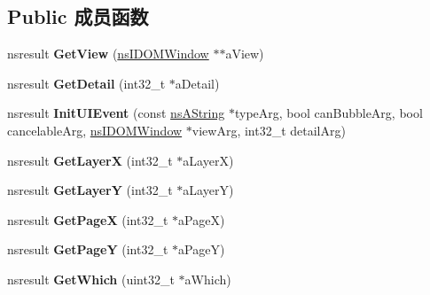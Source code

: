 \subsection*{Public 成员函数}
\begin{DoxyCompactItemize}
\item 
\mbox{\label{interfacens_i_d_o_m_u_i_event_a0cf4ab5a8ab56b5f8e08f48831ef4e7d}} 
nsresult {\bfseries Get\+View} (\hyperlink{interfacens_i_d_o_m_window}{ns\+I\+D\+O\+M\+Window} $\ast$$\ast$a\+View)
\item 
\mbox{\label{interfacens_i_d_o_m_u_i_event_ad0227746e026d51cd60985fc36b46f92}} 
nsresult {\bfseries Get\+Detail} (int32\+\_\+t $\ast$a\+Detail)
\item 
\mbox{\label{interfacens_i_d_o_m_u_i_event_ac4072bce3d33cdb7b36c7b4d20dc8b73}} 
nsresult {\bfseries Init\+U\+I\+Event} (const \hyperlink{structns_string_container}{ns\+A\+String} $\ast$type\+Arg, bool can\+Bubble\+Arg, bool cancelable\+Arg, \hyperlink{interfacens_i_d_o_m_window}{ns\+I\+D\+O\+M\+Window} $\ast$view\+Arg, int32\+\_\+t detail\+Arg)
\item 
\mbox{\label{interfacens_i_d_o_m_u_i_event_a8554fbfc3ba91445cdc5555c84042443}} 
nsresult {\bfseries Get\+LayerX} (int32\+\_\+t $\ast$a\+LayerX)
\item 
\mbox{\label{interfacens_i_d_o_m_u_i_event_a56fdce5fe2959ebdad08deea2accde62}} 
nsresult {\bfseries Get\+LayerY} (int32\+\_\+t $\ast$a\+LayerY)
\item 
\mbox{\label{interfacens_i_d_o_m_u_i_event_ad2eed99b88f5ecb4b3ff953fd1f0892a}} 
nsresult {\bfseries Get\+PageX} (int32\+\_\+t $\ast$a\+PageX)
\item 
\mbox{\label{interfacens_i_d_o_m_u_i_event_a16d6362a6d02ee7887fd1547893a0056}} 
nsresult {\bfseries Get\+PageY} (int32\+\_\+t $\ast$a\+PageY)
\item 
\mbox{\label{interfacens_i_d_o_m_u_i_event_a73f2071cf0215e22d78cb4e7c2d028d1}} 
nsresult {\bfseries Get\+Which} (uint32\+\_\+t $\ast$a\+Which)
$$
\end{DoxyCompactItemize}
